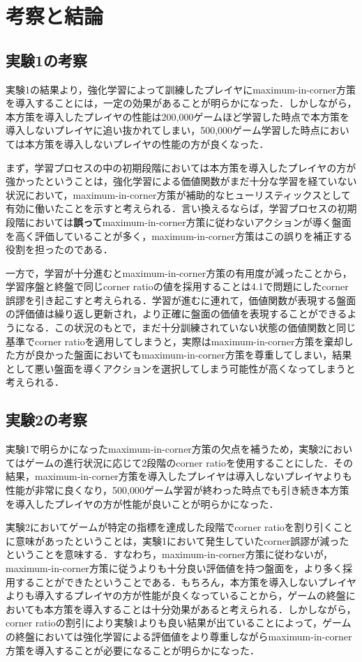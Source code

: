 \documentclass{suribt}
\begin{document}
\chapter{考察と結論}
\section{実験1の考察}
実験1の結果より，強化学習によって訓練したプレイヤにmaximum-in-corner方策を導入することには，一定の効果があることが明らかになった．しかしながら，本方策を導入したプレイヤの性能は200,000ゲームほど学習した時点で本方策を導入しないプレイヤに追い抜かれてしまい，500,000ゲーム学習した時点においては本方策を導入しないプレイヤの性能の方が良くなった．

まず，学習プロセスの中の初期段階においては本方策を導入したプレイヤの方が強かったということは，強化学習による価値関数がまだ十分な学習を経ていない状況において，maximum-in-corner方策が補助的なヒューリスティックスとして有効に働いたことを示すと考えられる．言い換えるならば，学習プロセスの初期段階においては\textbf{誤って}maximum-in-corner方策に従わないアクションが導く盤面を高く評価していることが多く，maximum-in-corner方策はこの誤りを補正する役割を担ったのである．

一方で，学習が十分進むとmaximum-in-corner方策の有用度が減ったことから，学習序盤と終盤で同じcorner ratioの値を採用することは4.1で問題にしたcorner誤謬を引き起こすと考えられる．学習が進むに連れて，価値関数が表現する盤面の評価値は繰り返し更新され，より正確に盤面の価値を表現することができるようになる．この状況のもとで，まだ十分訓練されていない状態の価値関数と同じ基準でcorner ratioを適用してしまうと，実際はmaximum-in-corner方策を棄却した方が良かった盤面においてもmaximum-in-corner方策を尊重してしまい，結果として悪い盤面を導くアクションを選択してしまう可能性が高くなってしまうと考えられる．

\section{実験2の考察}
実験1で明らかになったmaximum-in-corner方策の欠点を補うため，実験2においてはゲームの進行状況に応じて2段階のcorner ratioを使用することにした．その結果，maximum-in-corner方策を導入したプレイヤは導入しないプレイヤよりも性能が非常に良くなり，500,000ゲーム学習が終わった時点でも引き続き本方策を導入したプレイヤの方が性能が良いことが明らかになった．

実験2においてゲームが特定の指標を達成した段階でcorner ratioを割り引くことに意味があったということは，実験1において発生していたcorner誤謬が減ったということを意味する．すなわち，maximum-in-corner方策に従わないが，maximum-in-corner方策に従うよりも十分良い評価値を持つ盤面を，より多く採用することができたということである．もちろん，本方策を導入しないプレイヤよりも導入するプレイヤの方が性能が良くなっていることから，ゲームの終盤においても本方策を導入することは十分効果があると考えられる．しかしながら，corner ratioの割引により実験1よりも良い結果が出ていることによって，ゲームの終盤においては強化学習による評価値をより尊重しながらmaximum-in-corner方策を導入することが必要になることが明らかになった．
\end{document}
